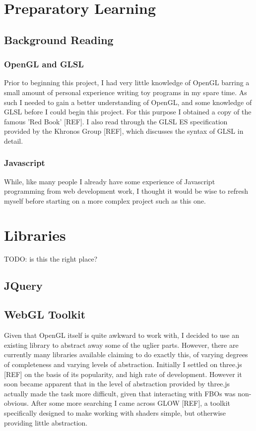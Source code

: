 \documentclass[12pt,twoside,notitlepage]{report}
\begin{document}
\section{Preparatory Learning}
\subsection{Background Reading}

\subsubsection{OpenGL and GLSL}
Prior to beginning this project, I had very little knowledge of OpenGL barring a small amount of personal experience writing toy programs in my spare time. As such I needed to gain a better understanding of OpenGL, and some knowledge of GLSL before I could begin this project. For this purpose I obtained a copy of the famous 'Red Book' [REF]. I also read through the GLSL ES specification provided by the Khronos Group [REF], which discusses the syntax of GLSL in detail.

\subsubsection{Javascript}
While, like many people I already have some experience of Javascript programming from web development work, I thought it would be wise to refresh myself before starting on a more complex project such as this one. 


\section{Libraries}
TODO: is this the right place?

\subsection{JQuery}


\subsection{WebGL Toolkit}
Given that OpenGL itself is quite awkward to work with, I decided to use an existing library to abstract away some of the uglier parts. However, there are currently many libraries available claiming to do exactly this, of varying degrees of completeness and varying levels of abstraction. Initially I settled on three.js [REF] on the basis of its popularity, and high rate of development. However it soon became apparent that in the level of abstraction provided by three.js actually made the task more difficult, given that interacting with FBOs was non-obvious. After some more searching I came across GLOW [REF], a toolkit specifically designed to make working with shaders simple, but otherwise providing little abstraction.
\end{document}
